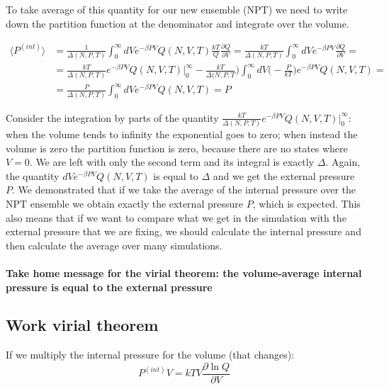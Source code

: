 To take average of this quantity for our new ensemble (NPT) we need to write down the partition function at the denominator and integrate over the volume. 

	\begin{align*}
		\langle P^{(int)}\rangle &= \frac{1}{\Delta(N, P, T)}\int_0^{\infty}dVe^{-\beta PV}Q(N, V, T)\frac{kT}{Q}\frac{\partial Q}{\partial V} = \frac{kT}{\Delta(N, P, T)}\int_0^{\infty}dVe^{-\beta PV}\frac{\partial Q}{\partial V}=\\
														 &= \frac{kT}{\Delta(N, P, T)}e^{-\beta PV}Q(N, V, T)|_0^{\infty}-\frac{kT}{\Delta(N, P, T})\int_0^{\infty}dV\biggl(-\frac{P}{kT}\biggr)e^{-\beta PV}Q(N, V, T) = \\
														 &=\frac{P}{\Delta(N, P, T)}\int_0^{\infty}dVe^{-\beta PV}Q(N, V, T) = P
	\end{align*}
	
	Consider the integration by parts of the quantity $\frac{kT}{\Delta(N, P, T)}e^{-\beta PV}Q(N, V, T)|_0^{\infty}$: when the volume tends to infinity the exponential goes to zero; when instead the volume is zero the partition function is zero, because there are no states where $V=0$. 
	We are left with only the second term and its integral is exactly $\Delta$. 
	Again, the quantity $dVe^{-\beta PV}Q(N, V, T)$ is equal to $\Delta$ and we get the external pressure $P$.
	We demonstrated that if we take the average of the internal pressure over the NPT ensemble we obtain exactly the external pressure $P$, which is expected.
	 This also means that if we want to compare what we get in the simulation with the external pressure that we are fixing, we should calculate the internal pressure and then calculate the average over many simulations.
	 
	 \paragraph{Take home message for the virial theorem: the volume-average internal pressure is equal to the external pressure}

	\subsection{Work virial theorem}
If we multiply the internal pressure for the volume (that changes):
	$$P^{(int)}V = kTV\frac{\partial \ln Q}{\partial V}$$
	
